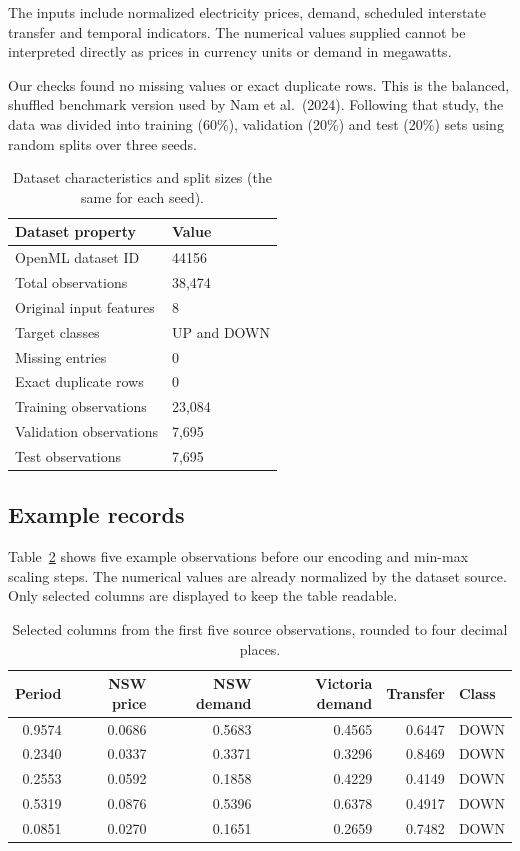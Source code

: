 \documentclass[11pt]{article}
\begin{document}
The inputs include normalized electricity prices, demand, scheduled interstate transfer and temporal
indicators. The numerical values supplied cannot be interpreted directly as prices in currency units
or demand in megawatts.

Our checks found no missing values or exact duplicate rows. This is the balanced, shuffled benchmark
version used by Nam et al.\ (2024). Following that study, the data was divided into training (60\%),
validation (20\%) and test (20\%) sets using random splits over three seeds.

\begin{table}[H]
\centering
\caption{Dataset characteristics and split sizes (the same for each seed).}
\label{tab:dataset}
\begin{tabular}{@{}ll@{}}
\toprule
Dataset property & Value \\
\midrule
OpenML dataset ID & 44156 \\
Total observations & 38,474 \\
Original input features & 8 \\
Target classes & UP and DOWN \\
Missing entries & 0 \\
Exact duplicate rows & 0 \\
Training observations & 23,084 \\
Validation observations & 7,695 \\
Test observations & 7,695 \\
\bottomrule
\end{tabular}
\end{table}

\subsection{Example records}

Table~\ref{tab:examples} shows five example observations before our encoding and min-max scaling
steps. The numerical values are already normalized by the dataset source. Only selected columns are
displayed to keep the table readable.

\begin{table}[H]
\centering
\caption{Selected columns from the first five source observations, rounded to four decimal places.}
\label{tab:examples}
\begin{tabular}{@{}rrrrrl@{}}
\toprule
Period & NSW price & NSW demand & Victoria demand & Transfer & Class \\
\midrule
0.9574 & 0.0686 & 0.5683 & 0.4565 & 0.6447 & DOWN \\
0.2340 & 0.0337 & 0.3371 & 0.3296 & 0.8469 & DOWN \\
0.2553 & 0.0592 & 0.1858 & 0.4229 & 0.4149 & DOWN \\
0.5319 & 0.0876 & 0.5396 & 0.6378 & 0.4917 & DOWN \\
0.0851 & 0.0270 & 0.1651 & 0.2659 & 0.7482 & DOWN \\
\bottomrule
\end{tabular}
\end{table}
\end{document}
